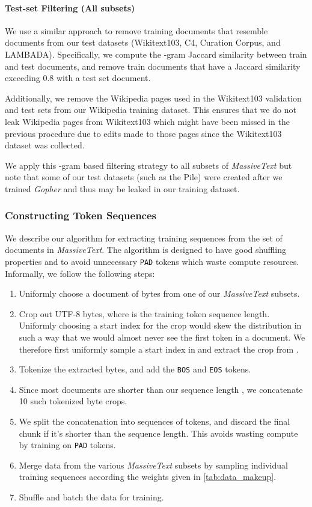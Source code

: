 \documentclass[11pt, a4paper, logo, internal, copyright, nonumbering]{deepmind}
\newcommand{\massivetext}{\textit{MassiveText}\xspace}
\newcommand{\gopher}{\textit{Gopher}\xspace}
\begin{document}
\paragraph{Test-set Filtering (All subsets)}
\label{app:test_set_filtering}
We use a similar approach to remove training documents that resemble documents from our test datasets (Wikitext103, C4, Curation Corpus, and LAMBADA). Specifically, we compute the -gram Jaccard similarity between train and test documents, and remove train documents that have a Jaccard similarity exceeding 0.8 with a test set document.

Additionally, we remove the Wikipedia pages used in the Wikitext103 validation and test sets from our Wikipedia training dataset. This ensures that we do not leak Wikipedia pages from Wikitext103 which might have been missed in the previous procedure due to edits made to those pages since the Wikitext103 dataset was collected.

We apply this -gram based filtering strategy to all subsets of \massivetext but note that some of our test datasets (such as the Pile) were created after we trained \gopher and thus may be leaked in our training dataset.

\subsubsection{Constructing Token Sequences}
We describe our algorithm for extracting training sequences from the set of documents in \massivetext. The algorithm is designed to have good shuffling properties and to avoid unnecessary \texttt{PAD} tokens which waste compute resources. Informally, we follow the following steps:


\begin{enumerate}
    \item Uniformly choose a document of  bytes from one of our \massivetext subsets.
    \item Crop out  UTF-8 bytes, where  is the training token sequence length. Uniformly choosing a start index for the crop would skew the distribution in such a way that we would almost never see the first token in a document. We therefore first uniformly sample a start index  in  and extract the crop from .
    \item Tokenize the extracted bytes, and add the \texttt{BOS} and \texttt{EOS} tokens.
    \item Since most documents are shorter than our sequence length , we concatenate 10 such tokenized byte crops.
    \item We split the concatenation into sequences of  tokens, and discard the final chunk if it's shorter than the sequence length. This avoids wasting compute by training on \texttt{PAD} tokens.
    \item Merge data from the various \massivetext subsets by sampling individual training sequences according the weights given in \autoref{tab:data_makeup}.
    \item Shuffle and batch the data for training.
\end{enumerate}
\end{document}
